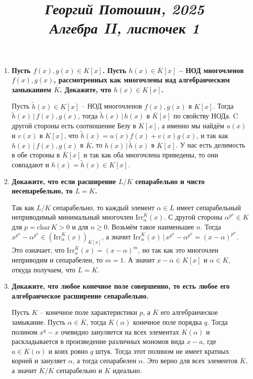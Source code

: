 \documentclass{article}
\title{
\textit{\small{Георгий Потошин, 2025}}\\
\vspace{0.3ex}
\textit{\huge{Алгебра II, листочек 1}}\vspace{1ex}
}
\date{\vspace{-10ex}}
\begin{document}
\maketitle

\begin{enumerate}
    \item \textbf{Пусть $f(x),g(x)\in K[x]$. Пусть $h(x)\in\overline K[x]$ – НОД
        многочленов $f(x),g(x)$, рассмотренных как многочлены над
        алгебраическим замыканием $\overline K$. Докажите, что $h(x)\in K[x]$.}

        Пусть $\widetilde h(x)\in K[x]$ – НОД многочленов $f(x),g(x)$ в $K[x]$.
        Тогда $\widetilde h(x)\,|\,f(x),g(x)$, тогда $\widetilde h(x)\,|\,h(x)$ в
        $\overline K[x]$ по свойству НОДа. C другой стороны есть соотношение
        Безу в $K[x]$, а именно мы найдём $u(x)$ и $v(x)$ в $K[x]$, что $\widetilde
        h(x)=u(x)f(x)+v(x)g(x)$, и так как $h(x)\,|\, f(x),g(x)$ в $\overline K$,
        то $h(x)\,|\,\widetilde h(x)$ в $\overline K[x]$. У нас есть делимость в
        обе стороны в $\overline K[x]$ и так как оба многочлена приведены, то
        они совпадают и $h(x)=\widetilde h(x)\in K[x]$.

    \item \textbf{Докажите, что если расширение $L/K$ сепарабельно и чисто
        несепаребельно, то $L = K$.}

        Так как $L/K$ сепарабельно, то каждый элемент $\alpha\in L$ имеет сепарабельный
        неприводимый минимальный многочлен $\text{Irr}_\alpha^K(x)$. С другой
        стороны $\alpha^{p^n}\in K$ для $p=\text{char}\,K>0$ и для $n\geq 0$.
        Возьмём такое наименьшее $n$. Тогда $x^{p^n}-\alpha^{p^n}\in(\text{Irr}
        _\alpha^K(x))_{K[x]}$, а значит $\text{Irr}^K_\alpha(x)\,|\,x^{p^n}-
        \alpha^{p^n}=(x-\alpha)^{p^n}$. Это означает, что $\text{Irr}^K_\alpha(x)
        =(x-\alpha)^m$, но так как это многочлен неприводим и сепарабелен, то
        $m=1$. А значит $x-\alpha\in K[x]$ и $\alpha\in K$, откуда получаем, что
        $L=K$.

    \item \textbf{Докажите, что любое конечное поле совершенно, то есть любое
        его алгебраическое расширение сепарабельно.}
    
        Пусть $K$ – конечное поле характеристики $p$, а $\overline K$ его
        алгебраическое замыкание. Пусть $\alpha\in\overline K$, тогда $K(\alpha)$
        конечное поле порядка $q$. Тогда полином $x^q-x$ очевидно зануляется на
        всех элементах $K(\alpha)$ и раскладывается в произведение различных
        мономов вида $x-a$, где $a\in K(\alpha)$ и коих ровно $q$ штук. Тогда
        этот полином не имеет кратных корней и зануляет $\alpha$, а тогда сепарабелен
        $\alpha$. Это верно для всех элементов $\overline K$, а значит $
        \overline K/K$ сепарабельно и $K$ идеально.


\end{enumerate}
\end{document}
